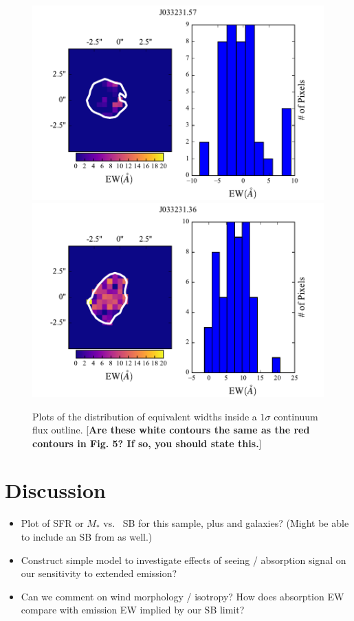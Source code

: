 \documentclass[twocolumn]{aastex6}
\begin{document}
\begin{figure}[h!]
\includegraphics[scale=.58]{../Figures/J57EW.pdf}
\includegraphics[scale=.58]{../Figures/J36EW.pdf}
\caption{ Plots of the distribution of equivalent widths inside a $1\sigma$ continuum flux outline. 
[{\bf Are these white contours the same as the red contours in Fig. 5?  If so, you should state this.}]
}
\label{fig:ew_images}
\end{figure}

\section{Discussion}

\begin{itemize}

\item Plot of SFR or $M_*$ vs.\  SB for this sample, plus \cite{Rubin_2011} and \cite{Martin_2013} galaxies?  (Might be able to include an SB from \cite{Erb_2012} as well.)

\item Construct simple model to investigate effects of seeing / absorption signal on our sensitivity to extended emission?

\item Can we comment on wind morphology / isotropy?  How does absorption EW compare with emission EW implied by our SB limit?

\end{itemize}
\end{document}
